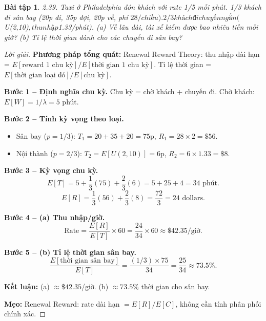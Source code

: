 \documentclass[8pt,a4paper]{article}
\newtheorem{exercise}{Bài tập}
\newenvironment{solution}{\begin{proof}[Lời giải]}{\end{proof}}
\begin{document}
\begin{exercise}
2.39. Taxi ở Philadelphia đón khách với rate 1/5 mỗi phút. 1/3 khách đi sân bay (20p đi, 35p đợi, 20p về, phí $28/chiều). 2/3 khách đi chuyến ngắn ($U(2,10)$, thu nhập $1.33/phút). 
(a) Về lâu dài, tài xế kiếm được bao nhiêu tiền mỗi giờ?
(b) Tỉ lệ thời gian dành cho các chuyến đi sân bay?
\end{exercise}
\begin{solution}
\textbf{Phương pháp tổng quát:} Renewal Reward Theory: thu nhập dài hạn = $E[\text{reward 1 chu kỳ}] / E[\text{thời gian 1 chu kỳ}]$. Tỉ lệ thời gian = $E[\text{thời gian loại đó}] / E[\text{chu kỳ}]$.

\textbf{Bước 1 -- Định nghĩa chu kỳ.} Chu kỳ = chờ khách + chuyến đi. Chờ khách: $E[W] = 1/\lambda = 5$ phút.

\textbf{Bước 2 -- Tính kỳ vọng theo loại.}
\begin{itemize}[nosep]
  \item Sân bay ($p = 1/3$): $T_1 = 20 + 35 + 20 = 75$p, $R_1 = 28 \times 2 = \$56$.
  \item Nội thành ($p = 2/3$): $T_2 = E[U(2,10)] = 6$p, $R_2 = 6 \times 1.33 = \$8$.
\end{itemize}

\textbf{Bước 3 -- Kỳ vọng chu kỳ.}
\[
  E[T] = 5 + \frac{1}{3}(75) + \frac{2}{3}(6) = 5 + 25 + 4 = 34 \text{ phút}.
\]
\[
  E[R] = \frac{1}{3}(56) + \frac{2}{3}(8) = \frac{72}{3} = 24 \text{ dollars}.
\]

\textbf{Bước 4 -- (a) Thu nhập/giờ.}
\[
  \text{Rate} = \frac{E[R]}{E[T]} \times 60 = \frac{24}{34} \times 60 \approx \boxed{\$42.35/\text{giờ}}.
\]

\textbf{Bước 5 -- (b) Tỉ lệ thời gian sân bay.}
\[
  \frac{E[\text{thời gian sân bay}]}{E[T]} = \frac{(1/3) \times 75}{34} = \frac{25}{34} \approx \boxed{73.5\%}.
\]

\textbf{Kết luận:} (a) $\approx \$42.35$/giờ. (b) $\approx 73.5\%$ thời gian cho sân bay.

\textbf{Mẹo:} Renewal Reward: rate dài hạn $= E[R]/E[C]$, không cần tính phân phối chính xác.
\end{solution}
\end{document}
